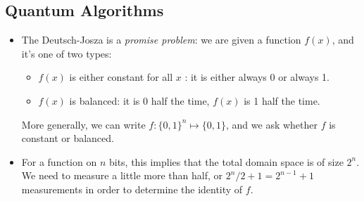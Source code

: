 \subsection{Quantum Algorithms}
\begin{itemize}
	\item The Deutsch-Josza is a \textit{promise problem}: we are given a function \( f(x) \), and 
		it's one of two types: 
		\begin{itemize}
			\item \( f(x) \) is either constant for all \( x \) : it is either always 0 or always 1.
			\item \( f(x) \) is balanced: it is 0 half the time, \( f(x)  \) is 1 half the time. 
		\end{itemize}

		More generally, we can write \( f: \{0, 1\} ^{n} \mapsto \{0, 1\}  \), and we ask whether \( f \) is 
		constant or balanced. 
	\item For a function on \( n \) bits, this implies that the total domain space is of size \( 2^{n} \). We need to 
		measure a little more than half, or \( 2^{n} / 2 + 1 = 2^{n - 1} + 1 \) measurements in order to determine 
		the identity of \( f \).


\end{itemize}
